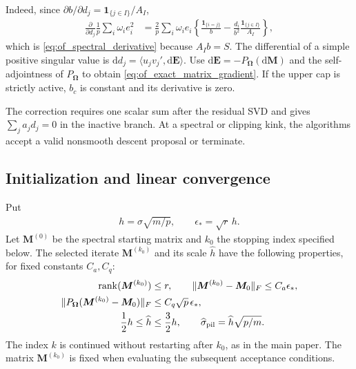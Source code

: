\documentclass[numsec,webpdf,modern,large,namedate]{oup-authoring-template}
\theoremstyle{plain}
\theoremstyle{remark}
\newcommand{\M}{\bm{M}}
\newcommand{\bOmega}{\bm{\Omega}}
\newif\ifmarkchanges
\newenvironment{revision}{\begingroup\ifmarkchanges\color{red}\fi}{\endgroup}
\begin{document}
\begin{revision}
Indeed, since $\partial b/\partial d_j=\mathbf1_{\{j\in I\}}/A_I$,
\begin{align*}
 \frac{\partial}{\partial d_j}\frac1p\sum_i\omega_i e_i^2
 &=\frac2p\sum_i\omega_i e_i
   \left\{\frac{\mathbf1_{\{i=j\}}}{b}
     -\frac{d_i}{b^2}\frac{\mathbf1_{\{j\in I\}}}{A_I}\right\},
\end{align*}
which is \eqref{eq:of_spectral_derivative} because $A_Ib=S$.
The differential of a simple positive singular value is
$\mathrm d d_j=\langle u_jv_j',\mathrm d\bm E\rangle$.
Use $\mathrm d\bm E=-P_{\bOmega}(\mathrm d\M)$ and the
self-adjointness of $P_{\bOmega}$ to obtain
\eqref{eq:of_exact_matrix_gradient}.  If the upper cap is strictly active,
$b_c$ is constant and its derivative is zero.


The correction requires one scalar sum after the residual SVD and gives
$\sum_j a_jd_j=0$ in the inactive branch. At a spectral or clipping kink,
the algorithms accept a valid nonsmooth descent proposal or terminate.

\subsection{Initialization and linear convergence}
\label{sec:initialization}
Put
\begin{align*}
 h=\sigma\sqrt{m/p},\qquad \epsilon_*=\sqrt r\,h.
\end{align*}
Let $\M^{(0)}$ be the spectral starting matrix and $k_0$ the stopping
index specified below. The selected iterate $\M^{(k_0)}$ and its scale
$\widehat h$ have the following properties, for fixed constants $C_a,C_q$:
\begin{align}
 \operatorname{rank}(\M^{(k_0)})&\le r,\qquad
 \|\M^{(k_0)}-\M_0\|_F\le C_a\epsilon_*,\label{eq:of_anchor_frobenius}\\
 \|P_{\bOmega}(\M^{(k_0)}-\M_0)\|_F
       &\le C_q\sqrt p\,\epsilon_*,\label{eq:of_anchor_sampled}\\
 \frac12h\le\widehat h&\le\frac32h,
 \qquad \widehat\sigma_{\rm pil}=\widehat h\sqrt{p/m}.
 \label{eq:of_anchor_scale}
\end{align}
The index $k$ is continued without restarting after $k_0$, as in the main
paper. The matrix $\M^{(k_0)}$ is fixed when evaluating the subsequent
acceptance conditions.


\end{revision}
\end{document}
